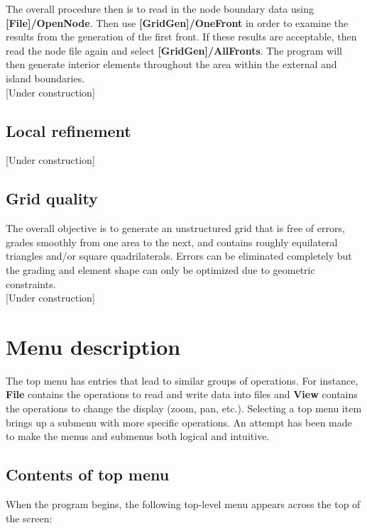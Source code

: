 \documentclass{article}
\begin{document}
The overall procedure then is to read in the node boundary data using \textbf{[File]/OpenNode}. Then use
\textbf{[GridGen]/OneFront} in order to examine the results from the generation of the first front. If these results are
acceptable, then read the node file again and select \textbf{[GridGen]/AllFronts}. The program will then generate interior
elements throughout the area within the external and island boundaries. \\

[Under construction]

\subsection{Local refinement}

[Under construction]

\subsection{Grid quality}

The overall objective is to generate an unstructured grid that is free of errors, grades smoothly
from one area to the next, and contains roughly equilateral triangles and/or square quadrilaterals. 
Errors can be eliminated completely  but the grading and element shape can only be optimized due to geometric 
constraints.\\

[Under construction]

\section{Menu description}

The top menu has entries that lead to similar groups of operations. For instance, \textbf{File} contains the operations
to read and write data into files and  \textbf{View} contains the operations to change the display (zoom, pan, etc.).
Selecting a top menu item brings up a submenu with more specific operations. An attempt has been made to make
the menus and submenus both logical and intuitive.

\subsection{Contents of top menu}
When the program begins, the following top-level menu appears across the top of the screen:
\\

\noindent
{}
\\
\end{document}
